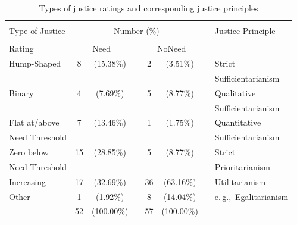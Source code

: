 \documentclass[12pt]{scrartcl}
\begin{document}
\begin{table}[ht!]
   \centering
   \caption{Types of justice ratings and corresponding justice principles}\label{tab:individual}
   {\normalsize\small
      \begin{tabular}{lccccccl}\hline\\[-2.5ex]
         Type of Justice   & \multicolumn{5}{c}{Number (\%)}                               &   & Justice Principle        \\\cline{2-6}\\[-2.5ex]
         Rating            & \multicolumn{2}{c}{Need}   &   & \multicolumn{2}{c}{NoNeed}   &   &                          \\\hline\hline
         Hump-Shaped       &  8   &  (15.38\%)          &   &  2   &   (3.51\%)            &   & Strict                   \\
                           &      &                     &   &      &                       &   & Sufficientarianism       \\[1ex]
         Binary            &  4   &   (7.69\%)          &   &  5   &   (8.77\%)            &   & Qualitative              \\
                           &      &                     &   &      &                       &   & Sufficientarianism       \\[1ex]
         Flat at/above     &  7   &  (13.46\%)          &   &  1   &   (1.75\%)            &   & Quantitative             \\
         Need Threshold    &      &                     &   &      &                       &   & Sufficientarianism       \\[1ex]
         Zero below        & 15   &  (28.85\%)          &   &  5   &   (8.77\%)            &   & Strict                   \\
         Need Threshold    &      &                     &   &      &                       &   & Prioritarianism          \\[1ex]
         Increasing        & 17   &  (32.69\%)          &   & 36   &  (63.16\%)            &   & Utilitarianism           \\[1ex]
         Other             &  1   &   (1.92\%)          &   &  8   &  (14.04\%)            &   & e.\,g.,~Egalitarianism   \\[0.5ex]\hline
                           & 52   & (100.00\%)          &   & 57   & (100.00\%)            &   &                          \\\hline
      \end{tabular}
   }
\end{table}
\end{document}

